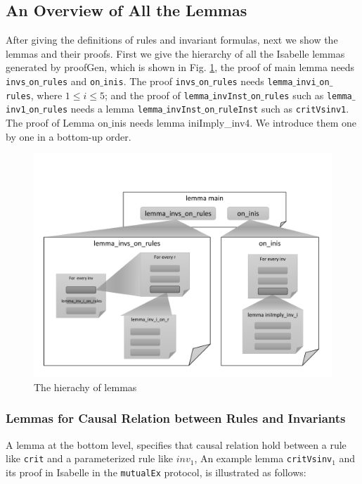 \documentclass{llncs}
\begin{document}
\subsection{An Overview of All the Lemmas}
After giving the definitions of rules and invariant formulas, next we show the lemmas and their proofs. First we give the hierarchy of all the Isabelle lemmas generated by {\sf proofGen}, which is shown  in Fig. \ref{fig:thyHierarchy}, the proof of main lemma needs {\tt invs$\_$on$\_$rules} and {\tt on$\_$inis}. The proof  {\tt invs$\_$on$\_$rules} needs {\tt lemma$\_$invi$\_$on$\_$rules}, where $1 \le i\le 5$; and the proof of {\tt lemma$\_$invInst$\_$on$\_$rules}  such as {\tt lemma$\_$inv1$\_$on$\_$rules} needs    a lemma {\tt lemma$\_$invInst$\_$on$\_$ruleInst} such as {\tt critVsinv1}. The proof of Lemma {\sf on$\_$inis} needs lemma {\sf iniImply\_inv4}. We introduce them one by one in a bottom-up order.

 \begin{figure}[!ht]\label{fig:thyHierarchy}
\includegraphics[width=1.0\textwidth]{thy.pdf}
 \caption{The hierachy of lemmas}

\end{figure}

\subsubsection{Lemmas for Causal Relation between Rules and Invariants}
 A lemma at the bottom level, specifies that causal relation hold between  a rule like  {\tt crit} and a parameterized rule like  $inv_1$, An  example lemma
{\tt critVsinv$_1$} and its proof in Isabelle in the {\tt mutualEx} protocol, is illustrated as follows:
\end{document}
